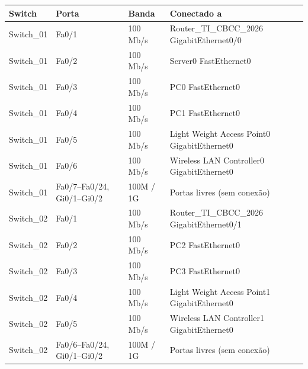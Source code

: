 \begin{tabular}{llll}
\toprule
Switch & Porta & Banda & Conectado a\\
\midrule
Switch\_01 & Fa0/1 & 100 Mb/s & Router\_TI\_CBCC\_2026 GigabitEthernet0/0\\
Switch\_01 & Fa0/2 & 100 Mb/s & Server0 FastEthernet0\\
Switch\_01 & Fa0/3 & 100 Mb/s & PC0 FastEthernet0\\
Switch\_01 & Fa0/4 & 100 Mb/s & PC1 FastEthernet0\\
Switch\_01 & Fa0/5 & 100 Mb/s & Light Weight Access Point0 GigabitEthernet0\\
Switch\_01 & Fa0/6 & 100 Mb/s & Wireless LAN Controller0 GigabitEthernet0\\
Switch\_01 & Fa0/7--Fa0/24, Gi0/1--Gi0/2 & 100M / 1G & Portas livres (sem conexão)\\
\midrule
Switch\_02 & Fa0/1 & 100 Mb/s & Router\_TI\_CBCC\_2026 GigabitEthernet0/1\\
Switch\_02 & Fa0/2 & 100 Mb/s & PC2 FastEthernet0\\
Switch\_02 & Fa0/3 & 100 Mb/s & PC3 FastEthernet0\\
Switch\_02 & Fa0/4 & 100 Mb/s & Light Weight Access Point1 GigabitEthernet0\\
Switch\_02 & Fa0/5 & 100 Mb/s & Wireless LAN Controller1 GigabitEthernet0\\
Switch\_02 & Fa0/6--Fa0/24, Gi0/1--Gi0/2 & 100M / 1G & Portas livres (sem conexão)\\
\bottomrule
\end{tabular}

